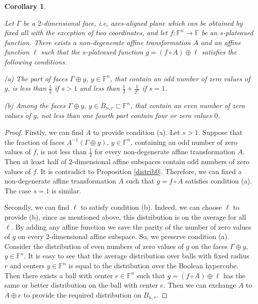 \documentclass[a4paper,12pt]{article}   %
\newtheorem{corollary}{Corollary}
\begin{document}
\begin{corollary}\label{distrib00}

Let $\Gamma$ be a $2$-dimensional face, i.e, axes-aligned plane
which can be obtained by fixed all with the exception of two
coordinates, and let $f:{\mathbb{F}}^n\rightarrow {\mathbb{F}}$ be
an $s$-plateaued function. There exists   a non-degenerate affine
transformation $A$ and an affine function $\ell$ such that the
$s$-plateaued  function $g=(f\circ A)\oplus\ell$ satisfies the
following conditions.

{\rm (a)} The part of faces  $\Gamma\oplus y$, $y\in
{\mathbb{F}}^n$, that contain an odd number of zero values of $g$,
is less than $\frac12$ if $s>1$ and less than
$\frac12+\frac{1}{2^n}$ if $s=1$.

{\rm (b)} Among the faces  $\Gamma\oplus y$, $y\in
B_{n,r}\subset{\mathbb{F}}^n$,
 that contain an even number of zero values of $g$, not less than
one fourth part contain four or zero values $0$.
\end{corollary}
\begin{proof}
Firstly, we can find $A$ to provide condition (a). Let $s>1$.
Suppose that  the fraction of faces $A^{-1}(\Gamma\oplus y)$, $y\in
{\mathbb{F}}^n$,  containing  an odd number of zero values of $f$,
is not less than $\frac12$ for every non-degenerate affine
transformation $A$. Then  at least  half of $2$-dimensional affine
subspaces contain odd numbers of zero values of $f$. It is
contradict to Proposition \ref{distrib0}. Therefore, we can fixed a
non-degenerate affine transformation $A$ such that $g= f\circ A$
satisfies condition (a). The case $s=1$ is similar.

 Secondly, we can find $\ell$ to satisfy
condition (b). Indeed, we can choose $\ell$ to provide (b), since as
mentioned above, this distribution is on the average for all $\ell$.
By adding any affine function we save the parity of the number of
zero values of $g$ on every $2$-dimensional affine subspace. So, we
preserve condition (a). Consider the distribution of even numbers of
zero values of $g$ on the faces  $\Gamma\oplus y$, $y\in
{\mathbb{F}}^n$. It is easy to see that the average distribution
over balls with fixed radius $r$ and  centers $y\in {\mathbb{F}}^n$
is equal to the distribution over the Boolean hypercube. Then there
exists a ball with center $e\in {\mathbb{F}}^n$ such that $g=
(f\circ A)\oplus\ell$ has the same or better distribution on the
ball with center $e$. Then we can exchange $A$ to $A\oplus e$ to
provide the required distribution on $B_{n,r}$.
\end{proof}
\end{document}
